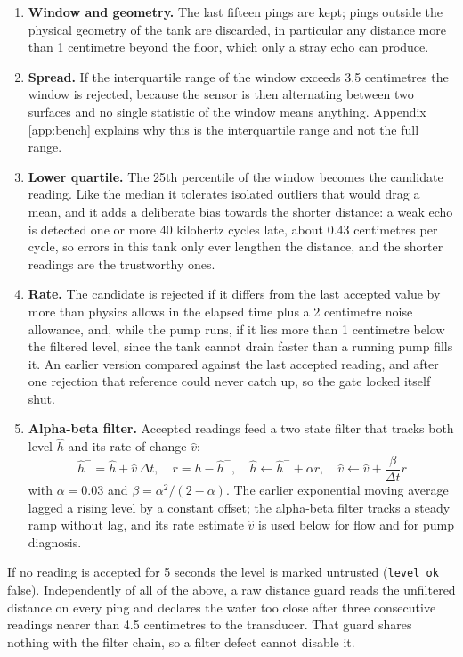 \begin{enumerate}
\item \textbf{Window and geometry.} The last fifteen pings are kept; pings outside the physical geometry of the tank are discarded, in particular any distance more than 1 centimetre beyond the floor, which only a stray echo can produce.
\item \textbf{Spread.} If the interquartile range of the window exceeds 3.5 centimetres the window is rejected, because the sensor is then alternating between two surfaces and no single statistic of the window means anything. Appendix \ref{app:bench} explains why this is the interquartile range and not the full range.
\item \textbf{Lower quartile.} The 25th percentile of the window becomes the candidate reading. Like the median it tolerates isolated outliers that would drag a mean, and it adds a deliberate bias towards the shorter distance: a weak echo is detected one or more 40 kilohertz cycles late, about 0.43 centimetres per cycle, so errors in this tank only ever lengthen the distance, and the shorter readings are the trustworthy ones.
\item \textbf{Rate.} The candidate is rejected if it differs from the last accepted value by more than physics allows in the elapsed time plus a 2 centimetre noise allowance, and, while the pump runs, if it lies more than 1 centimetre below the filtered level, since the tank cannot drain faster than a running pump fills it. An earlier version compared against the last accepted reading, and after one rejection that reference could never catch up, so the gate locked itself shut.
\item \textbf{Alpha-beta filter.} Accepted readings feed a two state filter that tracks both level $\hat{h}$ and its rate of change $\hat{v}$:
\begin{equation}
\hat{h}^- = \hat{h} + \hat{v}\,\Delta t,\quad r = h - \hat{h}^-,\quad
\hat{h} \leftarrow \hat{h}^- + \alpha r,\quad \hat{v} \leftarrow \hat{v} + \frac{\beta}{\Delta t} r
\label{eq:alphabeta}
\end{equation}
with $\alpha = 0.03$ and $\beta = \alpha^2/(2-\alpha)$. The earlier exponential moving average lagged a rising level by a constant offset; the alpha-beta filter tracks a steady ramp without lag, and its rate estimate $\hat{v}$ is used below for flow and for pump diagnosis.
\end{enumerate}

If no reading is accepted for 5 seconds the level is marked untrusted (\texttt{level\_ok} false). Independently of all of the above, a raw distance guard reads the unfiltered distance on every ping and declares the water too close after three consecutive readings nearer than 4.5 centimetres to the transducer. That guard shares nothing with the filter chain, so a filter defect cannot disable it.


